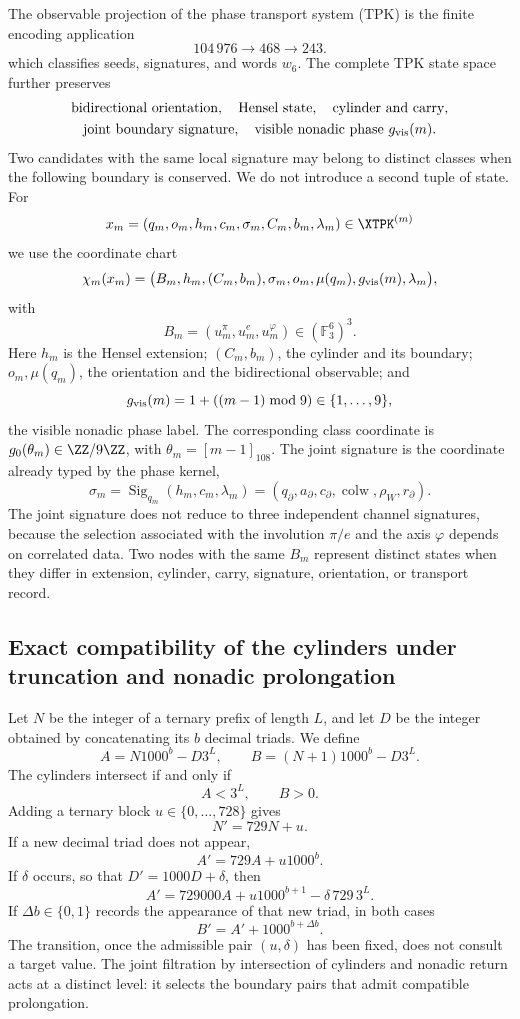The observable projection of the phase transport system (TPK) is the
finite encoding application
\[
104\,976\longrightarrow468\longrightarrow243.
\]
which classifies seeds, signatures, and words \(w_6\). The complete TPK
state space further preserves
\[
\begin{gathered}
\text{bidirectional orientation},\quad
\text{Hensel state},\quad
\text{cylinder and carry},\\
\text{joint boundary signature},\quad
\text{visible nonadic phase }g_{\rm vis}(m).
\end{gathered}
\]
Two candidates with the same local signature may belong to distinct classes
when the following boundary is conserved. We do not introduce a second tuple
of state. For
\[
x_m=(q_m,o_m,h_m,c_m,\sigma_m,C_m,b_m,\lambda_m)\in\XTPK^{(m)}
\]
we use the coordinate chart
\[
\chi_m(x_m)=
\bigl(
B_m,h_m,(C_m,b_m),\sigma_m,
o_m,\mu(q_m),g_{\rm vis}(m),\lambda_m
\bigr),
\]
with
\[
B_m=(u_m^\pi,u_m^e,u_m^\varphi)\in(\mathbb F_3^6)^3.
\]
Here \(h_m\) is the Hensel extension; \((C_m,b_m)\), the cylinder and its
boundary; \(o_m,\mu(q_m)\), the orientation and the bidirectional observable; and
\[
g_{\rm vis}(m)=1+((m-1)\bmod9)\in\{1,\ldots,9\},
\]
the visible nonadic phase label. The corresponding class coordinate
is \(g_0(\theta_m)\in\ZZ/9\ZZ\), with \(\theta_m=[m-1]_{108}\). The joint signature
is the coordinate already typed by the phase kernel,
\[
\sigma_m=\operatorname{Sig}_{q_m}(h_m,c_m,\lambda_m)
=(q_\partial,a_\partial,c_\partial,
\operatorname{colw},\rho_W,r_\partial).
\]
The joint signature does not reduce to three independent channel signatures, because the
selection associated with the involution \(\pi/e\) and the axis \(\varphi\) depends on
correlated data. Two nodes with the same \(B_m\) represent distinct
states when they differ in extension, cylinder, carry, signature, orientation,
or transport record.

\subsection{Exact compatibility of the cylinders under truncation and nonadic prolongation}

Let \(N\) be the integer of a ternary prefix of length \(L\), and let \(D\)
be the integer obtained by concatenating its \(b\) decimal triads. We define
\[
A=N1000^b-D3^L,
\qquad
B=(N+1)1000^b-D3^L.
\]
The cylinders intersect if and only if
\[
\boxed{A<3^L,\qquad B>0.}
\]
Adding a ternary block \(u\in\{0,\ldots,728\}\) gives
\[
N'=729N+u.
\]
If a new decimal triad does not appear,
\[
A'=729A+u1000^b.
\]
If \(\delta\) occurs, so that \(D'=1000D+\delta\), then
\[
A'=729000A+u1000^{b+1}-\delta\,729\,3^L.
\]
If \(\Delta b\in\{0,1\}\) records the appearance of that new triad, in
both cases
\[
B'=A'+1000^{b+\Delta b}.
\]
The transition, once the admissible pair \((u,\delta)\) has been fixed, does not consult a
target value. The joint filtration by intersection of cylinders and nonadic
return acts at a distinct level: it selects the boundary pairs that
admit compatible prolongation.


